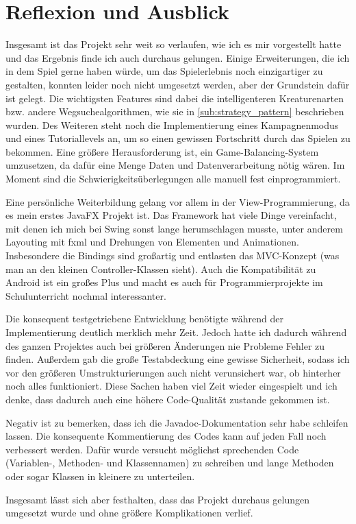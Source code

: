 \section{Reflexion und Ausblick} %
\label{sec:reflexion}

Insgesamt ist das Projekt sehr weit so verlaufen, wie ich es mir vorgestellt hatte und das Ergebnis finde ich auch durchaus gelungen. Einige Erweiterungen, die ich in dem Spiel gerne haben würde, um das Spielerlebnis noch einzigartiger zu gestalten, konnten leider noch nicht umgesetzt werden, aber der Grundstein dafür ist gelegt. Die wichtigsten Features sind dabei die intelligenteren Kreaturenarten bzw. andere Wegsuchealgorithmen, wie sie in \ref{sub:strategy_pattern} beschrieben wurden. Des Weiteren steht noch die Implementierung eines Kampagnenmodus und eines Tutoriallevels an, um so einen gewissen Fortschritt durch das Spielen zu bekommen. Eine größere Herausforderung ist, ein Game-Balancing-System umzusetzen, da dafür eine Menge Daten und Datenverarbeitung nötig wären. Im Moment sind die Schwierigkeitsüberlegungen alle manuell fest einprogrammiert. 

Eine persönliche Weiterbildung gelang vor allem in der View-Programmierung, da es mein erstes JavaFX Projekt ist. Das Framework hat viele Dinge vereinfacht, mit denen ich mich bei Swing sonst lange herumschlagen musste, unter anderem Layouting mit fxml und Drehungen von Elementen und Animationen. Insbesondere die Bindings sind großartig und entlasten das MVC-Konzept (was man an den kleinen Controller-Klassen sieht). Auch die Kompatibilität zu Android ist ein großes Plus und macht es auch für Programmierprojekte im Schulunterricht nochmal interessanter.

Die konsequent testgetriebene Entwicklung benötigte während der Implementierung deutlich merklich mehr Zeit. Jedoch hatte ich dadurch während des ganzen Projektes auch bei größeren Änderungen nie Probleme Fehler zu finden. Außerdem gab die große Testabdeckung eine gewisse Sicherheit, sodass ich vor den größeren Umstrukturierungen auch nicht verunsichert war, ob hinterher noch alles funktioniert. Diese Sachen haben viel Zeit wieder eingespielt und ich denke, dass dadurch auch eine höhere Code-Qualität zustande gekommen ist.

Negativ ist zu bemerken, dass ich die Javadoc-Dokumentation sehr habe schleifen lassen. Die konsequente Kommentierung des Codes kann auf jeden Fall noch verbessert werden. Dafür wurde versucht möglichst sprechenden Code (Variablen-, Methoden- und Klassennamen) zu schreiben und lange Methoden oder sogar Klassen in kleinere zu unterteilen.

Insgesamt lässt sich aber festhalten, dass das Projekt durchaus gelungen umgesetzt wurde und ohne größere Komplikationen verlief.